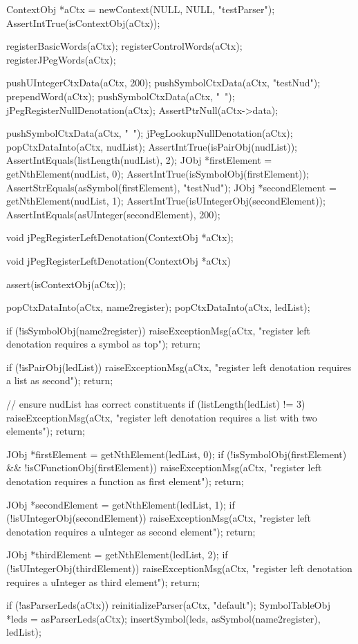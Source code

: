 
\startCTest
  ContextObj *aCtx = newContext(NULL, NULL, "testParser");
  AssertIntTrue(isContextObj(aCtx));
  
  registerBasicWords(aCtx);
  registerControlWords(aCtx);
  registerJPegWords(aCtx);
  
  pushUIntegerCtxData(aCtx, 200);
  pushSymbolCtxData(aCtx, "testNud");
  prependWord(aCtx);
  pushSymbolCtxData(aCtx, "~");
  jPegRegisterNullDenotation(aCtx);
  AssertPtrNull(aCtx->data);
  
  pushSymbolCtxData(aCtx, "~");
  jPegLookupNullDenotation(aCtx);
  popCtxDataInto(aCtx, nudList);
  AssertIntTrue(isPairObj(nudList));
  AssertIntEquals(listLength(nudList), 2);
  JObj *firstElement = getNthElement(nudList, 0);
  AssertIntTrue(isSymbolObj(firstElement));
  AssertStrEquals(asSymbol(firstElement), "testNud");
  JObj *secondElement = getNthElement(nudList, 1);
  AssertIntTrue(isUIntegerObj(secondElement));
  AssertIntEquals(asUInteger(secondElement), 200);
\stopCTest
\stopTestCase
\stopTestSuite


\startCHeader
void jPegRegisterLeftDenotation(ContextObj *aCtx);
\stopCHeader

\startCCode
void jPegRegisterLeftDenotation(ContextObj *aCtx) {
  assert(isContextObj(aCtx));

  popCtxDataInto(aCtx, name2register);
  popCtxDataInto(aCtx, ledList);

  if (!isSymbolObj(name2register)) {
    raiseExceptionMsg(aCtx,
      "register left denotation requires a symbol as top");
    return;
  }

  if (!isPairObj(ledList)) {
    raiseExceptionMsg(aCtx,
      "register left denotation requires a list as second");
    return;
  }

  // ensure nudList has correct constituents
  if (listLength(ledList) != 3) {
    raiseExceptionMsg(aCtx,
      "register left denotation requires a list with two elements");
    return;    
  }
  
  JObj *firstElement = getNthElement(ledList, 0);
  if (!isSymbolObj(firstElement) && !isCFunctionObj(firstElement)) {
    raiseExceptionMsg(aCtx,
      "register left denotation requires a function as first element");
    return;    
  }

  JObj *secondElement = getNthElement(ledList, 1);
  if (!isUIntegerObj(secondElement)) {
    raiseExceptionMsg(aCtx,
      "register left denotation requires a uInteger as second element");
    return;    
  }

  JObj *thirdElement = getNthElement(ledList, 2);
  if (!isUIntegerObj(thirdElement)) {
    raiseExceptionMsg(aCtx,
      "register left denotation requires a uInteger as third element");
    return;    
  }

  if (!asParserLeds(aCtx)) reinitializeParser(aCtx, "default");
  SymbolTableObj *leds = asParserLeds(aCtx);
  insertSymbol(leds, asSymbol(name2register), ledList);
}
\stopCCode

